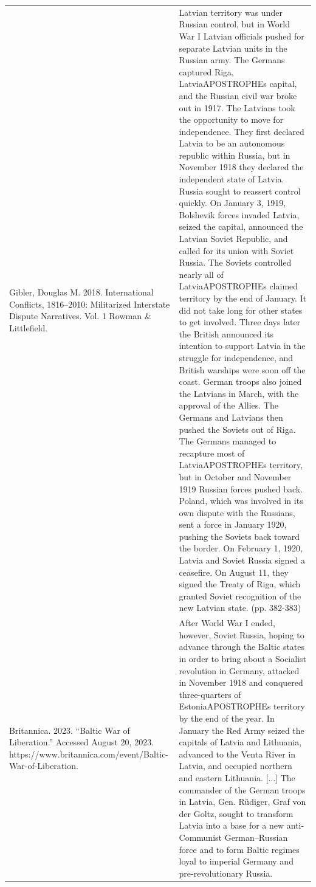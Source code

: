 {\begin{longtable}{p{}p{}}
Gibler, Douglas M. 2018. International Conflicts, 1816–2010: Militarized Interstate Dispute Narratives. Vol. 1 Rowman \& Littlefield. & Latvian territory was under Russian control, but in World War I Latvian officials pushed for separate Latvian units in the Russian army. The Germans captured Riga, LatviaAPOSTROPHEs capital, and the Russian civil war broke out in 1917. The Latvians took the opportunity to move for independence. They first declared Latvia to be an autonomous republic within Russia, but in November 1918 they declared the independent state of Latvia. Russia sought to reassert control quickly. On January 3, 1919, Bolshevik forces invaded Latvia, seized the capital, announced the Latvian Soviet Republic, and called for its union with Soviet Russia. The Soviets controlled nearly all of LatviaAPOSTROPHEs claimed territory by the end of January. It did not take long for other states to get involved. Three days later the British announced its intention to support Latvia in the struggle for independence, and British warships were soon off the coast. German troops also joined the Latvians in March, with the approval of the Allies. The Germans and Latvians then pushed the Soviets out of Riga. The Germans managed to recapture most of LatviaAPOSTROPHEs territory, but in October and November 1919 Russian forces pushed back. Poland, which was involved in its own dispute with the Russians, sent a force in January 1920, pushing the Soviets back toward the border. On February 1, 1920, Latvia and Soviet Russia signed a ceasefire. On August 11, they signed the Treaty of Riga, which granted Soviet recognition of the new Latvian state. (pp. 382-383)
\\
Britannica. 2023. “Baltic War of Liberation.” Accessed August 20, 2023. https://www.britannica.com/event/Baltic-War-of-Liberation. & After World War I ended, however, Soviet Russia, hoping to advance through the Baltic states in order to bring about a Socialist revolution in Germany, attacked in November 1918 and conquered three-quarters of EstoniaAPOSTROPHEs territory by the end of the year. In January the Red Army seized the capitals of Latvia and Lithuania, advanced to the Venta River in Latvia, and occupied northern and eastern Lithuania. [...] The commander of the German troops in Latvia, Gen. Rüdiger, Graf von der Goltz, sought to transform Latvia into a base for a new anti-Communist German–Russian force and to form Baltic regimes loyal to imperial Germany and pre-revolutionary Russia. 
\\

\end{longtable}}

